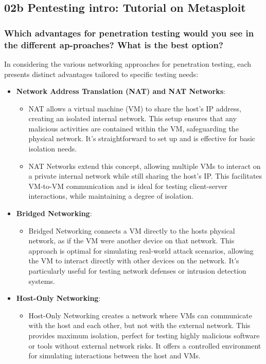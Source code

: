 \subsection{02b Pentesting intro: Tutorial on Metasploit}


\subsubsection{Which advantages for penetration testing would you see in the different ap-proaches? What is the best option?}

In considering the various networking approaches for penetration testing, each presents distinct advantages tailored to specific testing needs:

\begin{itemize}
    \item \textbf{Network Address Translation (NAT) and NAT Networks}:
          \begin{itemize}
              \item NAT allows a virtual machine (VM) to share the host's IP address,
                    creating an isolated internal network. This setup ensures that any malicious
                    activities are contained within the VM, safeguarding the physical network.
                    It's straightforward to set up and is effective for basic isolation needs.
              \item NAT Networks extend this concept, allowing multiple VMs to interact on a private internal network while still sharing the host's IP.
                    This facilitates VM-to-VM communication and is ideal for testing client-server interactions, while maintaining a degree of isolation.
          \end{itemize}
    \item \textbf{Bridged Networking}:
          \begin{itemize}
              \item Bridged Networking connects a VM directly to the hosts physical network, as if the VM were another device on that network.
                    This approach is optimal for simulating real-world attack scenarios, allowing the VM to interact directly with other devices on the network.
                    It's particularly useful for testing network defenses or intrusion detection systems.
          \end{itemize}
    \item \textbf{Host-Only Networking}:
          \begin{itemize}
              \item Host-Only Networking creates a network where VMs can communicate with the host and each other, but not with the external network.
                    This provides maximum isolation, perfect for testing highly malicious software or tools without external network risks.
                    It offers a controlled environment for simulating interactions between the host and VMs.
          \end{itemize}
\end{itemize}

